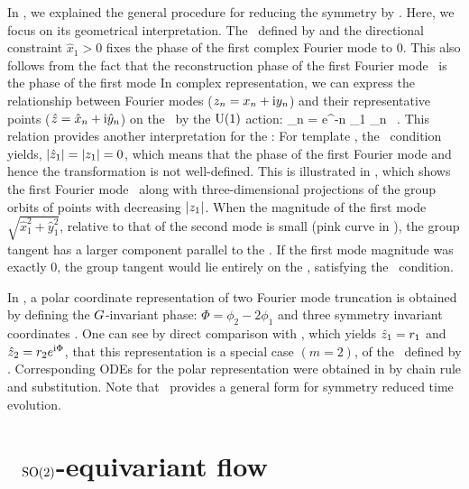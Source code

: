 \documentclass[aip,cha,
reprint,
secnumarabic,
nofootinbib, tightenlines,
nobibnotes, showkeys, showpacs,
superscriptaddress,
]{revtex4-1}
\begin{document}
In , we explained the general procedure for reducing the 
 symmetry by \mslices. Here, we focus on its geometrical 
interpretation. The \slice\ defined by  and the 
directional constraint $\hat{x}_1 > 0$ fixes the phase of the first complex 
Fourier mode to $0$. This also follows from the fact that the reconstruction 
phase of the first Fourier mode \slice\ is the phase of the first mode 
In complex representation, we can express the relationship between Fourier 
modes ($z_n = x_n + \mathrm{i} y_n$) and their representative points 
($\hat{z} = \hat{x}_n +  \mathrm{i} \hat{y}_n$) on the \slicePlane\ by the $\textrm{U}(1)$ 
action:
\beq
	\sspRedC_n = e^{-\ii n \phi_1} \sspC_n \, . 
This relation provides another interpretation for the \sliceBord:  For
template , the \sliceBord\ condition
 yields, $|\hat{z}_1| = |z_1| = 0$, which means
that the phase of the first Fourier mode and hence the
transformation  is not well-defined.
This is illustrated in , which shows the
first Fourier mode \slicePlane\ along with three-dimensional projections
of the group orbits of points with decreasing $|z_1|$. When the
magnitude of the first mode $\sqrt{\hat{x}_1^2 + \hat{y}_1^2}$, relative
to that of the second mode is small (pink curve in
), the group tangent has a larger component
parallel to the \slicePlane . If the first mode magnitude was exactly
$0$, the group tangent would lie entirely on the \slicePlane , satisfying
the \sliceBord\ condition.

In , a polar coordinate representation of two Fourier mode
truncation is obtained by defining the $G$-invariant phase: 
$\Phi = \phi_2 - 2 \phi_1$
and three symmetry invariant coordinates 
.
One can see by direct comparison with , which
yields $\hat{z}_1 = r_1$ and $\hat{z}_2 = r_2 e^{\mathrm{i} \Phi}$, that this
representation is a special case $(m=2)$, of the \slice\ defined by
. Corresponding ODEs for the polar representation
were obtained in  by  chain rule and substitution. Note
that \mslices\ provides a general form  for symmetry
reduced time evolution.

\section{\twoMode\ $\textrm{SO}(2)$-equivariant flow}
\label{s:twoMode}
\end{document}
